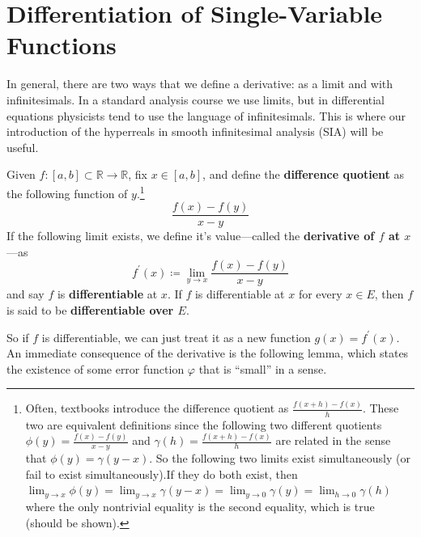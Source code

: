 \section{Differentiation of Single-Variable Functions} 

  In general, there are two ways that we define a derivative: as a limit and with infinitesimals. In a standard analysis course we use limits, but in differential equations physicists tend to use the language of infinitesimals. This is where our introduction of the hyperreals in smooth infinitesimal analysis (SIA) will be useful. 

  \begin{definition}
    Given $f: [a, b] \subset \mathbb{R} \to \mathbb{R}$, fix $x \in [a, b]$, and define the \textbf{difference quotient} as the following function of $y$.\footnote{Often, textbooks introduce the difference quotient as $\frac{f(x + h) - f(x)}{h}$. These two are equivalent definitions since the following two different quotients $\phi(y) = \frac{f(x) - f(y)}{x - y}$ and $\gamma(h) = \frac{f(x + h) - f(x)}{h}$ are related in the sense that $\phi(y) = \gamma(y - x)$. So the following two limits exist simultaneously (or fail to exist simultaneously).If they do both exist, then $\lim_{y \to x} \phi(y) = \lim_{y \to x} \gamma(y - x) = \lim_{y \to 0} \gamma(y) = \lim_{h \to 0} \gamma(h)$ where the only nontrivial equality is the second equality, which is true (should be shown). }
    \begin{equation}
      \frac{f(x) - f(y)}{x - y}
    \end{equation}
    If the following limit exists, we define it's value---called the \textbf{derivative of $f$ at $x$}---as 
    \begin{equation}
      f^\prime (x) \coloneqq \lim_{y \to x} \frac{f(x) - f(y)}{x - y}
    \end{equation}
    and say $f$ is \textbf{differentiable} at $x$. If $f$ is differentiable at $x$ for every $x \in E$, then $f$ is said to be \textbf{differentiable over $E$}. 
  \end{definition} 

  So if $f$ is differentiable, we can just treat it as a new function $g(x) = f^\prime (x)$. An immediate consequence of the derivative is the following lemma, which states the existence of some error function $\varphi$ that is ``small'' in a sense. 

